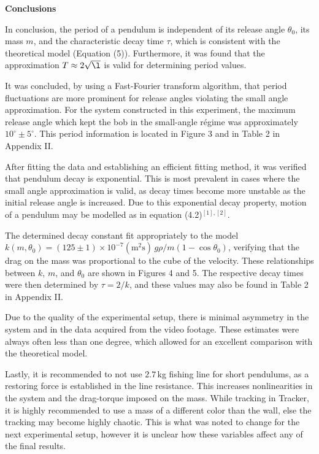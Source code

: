 \documentclass[11pt]{article}
\begin{document}
\begin{multicols}{2}
    






    \vspace{10pt}

     \selectfont \textbf{Conclusions}
    
     \selectfont 
    
    In conclusion, the period of a pendulum is independent of its release angle $\theta_0$, its mass $m$, and the characteristic decay time $\tau$, which is consistent with the theoretical model (Equation (5)). Furthermore, it was found that the approximation $T\approx 2\sqrt{\l}$ is valid for determining period values. 
    
    It was concluded, by using a Fast-Fourier transform algorithm, that period fluctuations are more prominent for release angles violating the small angle approximation. For the system constructed in this experiment, the maximum release angle which kept the bob in the small-angle régime was approximately $10^\circ \pm 5^\circ$. This period information is located in Figure 3 and in Table 2 in Appendix II. 
    
    After fitting the data and establishing an efficient fitting method, it was verified that pendulum decay is exponential. This is most prevalent in cases where the small angle approximation is valid, as decay times become more unstable as the initial release angle is increased. Due to this exponential decay property, motion of a pendulum may be modelled as in equation (4.2)$^{[1], [2]}$. 

    The determined decay constant fit appropriately to the model $k(m, \theta_0) = (125\pm 1)\times 10^{-7}(\text{m}^2\text{s})\, g\rho/m (1-\cos\theta_0)$, verifying that the drag on the mass was proportional to the cube of the velocity. These relationships between $k$, $m$, and $\theta_0$ are shown in Figures 4 and 5. The respective decay times were then determined by $\tau = 2/k$, and these values may also be found in Table 2 in Appendix II. 

    Due to the quality of the experimental setup, there is minimal asymmetry in the system and in the data acquired from the video footage. These estimates were always often less than one degree, which allowed for an excellent comparison with the theoretical model.

    Lastly, it is recommended to not use $2.7\,$kg fishing line for short pendulums, as a restoring force is established in the line resistance. This increases nonlinearities in the system and the drag-torque imposed on the mass. While tracking in Tracker, it is highly recommended to use a mass of a different color than the wall, else the tracking may become highly chaotic. This is what was noted to change for the next experimental setup, however it is unclear how these variables affect any of the final results.


\end{multicols}
\end{document}
